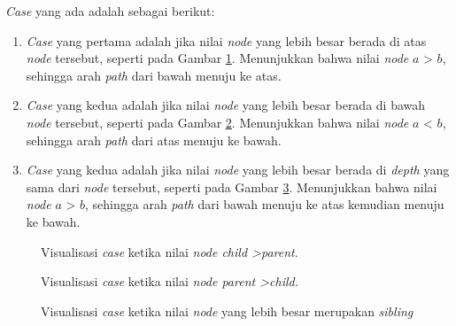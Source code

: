 \quad \textit{Case} yang ada adalah sebagai berikut:
\begin{enumerate}
	\item \textit{Case} yang pertama adalah jika nilai \textit{node} yang lebih besar berada di atas \textit{node} tersebut, seperti pada Gambar \ref{fig:case1}. Menunjukkan bahwa nilai \textit{node} $a$ > $b$, sehingga arah \textit{path} dari bawah menuju ke atas.
	\item \textit{Case} yang kedua adalah jika nilai \textit{node} yang lebih besar berada di bawah \textit{node} tersebut, seperti pada Gambar \ref{fig:case2}. Menunjukkan bahwa nilai \textit{node} $a$ < $b$, sehingga arah \textit{path} dari atas menuju ke bawah.
	\item \textit{Case} yang kedua adalah jika nilai \textit{node} yang lebih besar berada di \textit{depth} yang sama dari \textit{node} tersebut, seperti pada Gambar \ref{fig:case3}. Menunjukkan bahwa nilai \textit{node} $a$ > $b$, sehingga arah \textit{path} dari bawah menuju ke atas kemudian menuju ke bawah.
\end{enumerate} 
\begin{figure}[H]
	\centering
	\caption{Visualisasi \textit{case} ketika nilai \textit{node child \textgreater parent}.\label{fig:case1}}
\end{figure}
\begin{figure}[H]
	\centering
	\caption{Visualisasi \textit{case} ketika nilai \textit{node parent \textgreater child.}\label{fig:case2}}
\end{figure}
\begin{figure}[H]
	\centering
	\caption{Visualisasi \textit{case} ketika nilai \textit{node} yang lebih besar merupakan \textit{sibling}\label{fig:case3}}
\end{figure}

